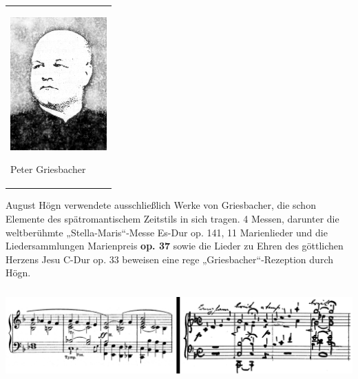 \begin{center}
\begin{minipage}{4.076cm}
\begin{flushleft}
\tablefirsthead{}
\tablehead{}
\tabletail{}
\tablelasttail{}
\begin{supertabular}{m{3.8760002cm}}

\includegraphics[width=3.694cm,height=5.106cm]{pictures/zulassungsarbeit-img091.jpg}

Peter Griesbacher\\
\end{supertabular}
\end{flushleft}
\end{minipage}
\end{center}

\begin{figure}
\img{}
\caption{}
\end{figure}

August Högn verwendete ausschließlich Werke von Griesbacher, die schon
Elemente des spätromantischem Zeitstils in sich tragen. 4 Messen,
darunter die weltberühmte „Stella-Maris“-Messe Es-Dur op. 141, 11
Marienlieder und die Liedersammlungen Marienpreis \textbf{\textmd{op.
37} }sowie die Lieder zu Ehren des göttlichen Herzens Jesu C-Dur op. 33
beweisen eine rege „Griesbacher“-Rezeption durch Högn.


\includegraphics[width=15.977cm,height=3.53cm]{pictures/zulassungsarbeit-img092.png}

\begin{figure}
\img{}
\caption{}
\end{figure}

